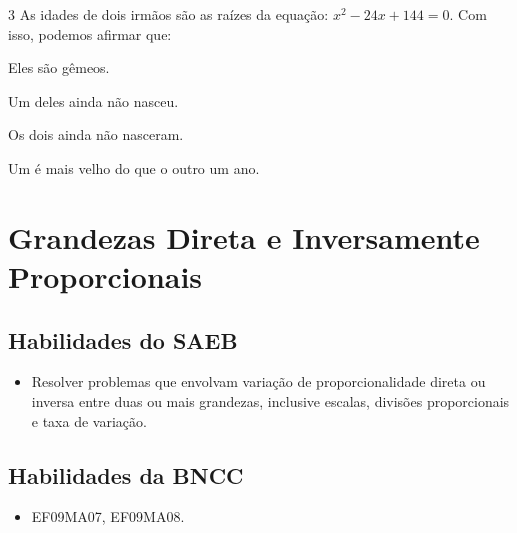 \begin{escolha}
\begin{escolha}
\num{3} As idades de dois irmãos são as raízes da equação: 
$x^2 - 24x + 144 = 0$. Com isso, podemos afirmar que:

\begin{escolha}
  \item Eles são gêmeos.

  \item Um deles ainda não nasceu.

  \item Os dois ainda não nasceram.

  \item Um é mais velho do que o outro um ano.
\end{escolha}

\chapter{Grandezas Direta e Inversamente Proporcionais}

\section{Habilidades do SAEB}

\begin{itemize}
  \item Resolver problemas que envolvam variação de proporcionalidade direta
ou inversa entre duas ou mais grandezas, inclusive escalas, divisões
proporcionais e taxa de variação.   
\end{itemize} 

\section{Habilidades da BNCC}

\begin{itemize}
  \item EF09MA07, EF09MA08.
\end{itemize}

\end{escolha}
\end{escolha}

